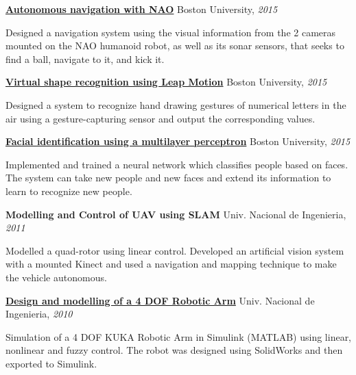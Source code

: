 \documentclass[letterpaper,MMMyyyy,nonstop]{simpleresumecv}
\begin{document}
\begin{body}
\href{http://www.bu.edu/vip/files/pubs/reports/DLTM15-06buece.pdf}
{\textbf{Autonomous navigation with NAO}}
\hfill
Boston University, \textit{2015}

\GapNoBreak
\BulletItem
Designed a navigation system using the visual information from the 2 cameras mounted on the NAO humanoid robot, as well as its sonar sensors, that seeks to find a ball, navigate to it, and kick it.
\GapNoBreak

\BigGap
\href{http://www.bu.edu/vip/files/pubs/reports/DLDP15-03buece.pdf}
{\textbf{Virtual shape recognition using Leap Motion}}
\hfill
Boston University, \textit{2015}

\GapNoBreak
\BulletItem
Designed a system to recognize hand drawing gestures of numerical letters in the air using a gesture-capturing sensor and  output the corresponding values.
\GapNoBreak

\BigGap
\href{https://docs.google.com/presentation/d/1328Qvm9VlAZadwlNoU3n5m1REY36m_hGcakSYlxW2vM/edit?ts=565d2938#slide=id.p}
{\textbf{Facial identification using a multilayer perceptron}}
\hfill
Boston University, \textit{2015}

\GapNoBreak
\BulletItem
Implemented and trained a neural network which classifies people based on faces. The system can take new people and new faces and extend its information to learn to recognize new people.
\GapNoBreak

\BigGap
\textbf{Modelling and Control of UAV using SLAM}
\hfill
Univ. Nacional de Ingenieria, \textit{2011}

\GapNoBreak
\BulletItem
Modelled a quad-rotor using linear control. Developed an artificial vision system with a mounted Kinect and used a navigation and mapping technique to make the vehicle autonomous.
\GapNoBreak

\BigGap
\href{https://github.com/davidlavy88/resume/blob/master/Paper/paper-mt-517.pdf}
{\textbf{Design and modelling of a 4 DOF Robotic Arm}}
\hfill
Univ. Nacional de Ingenieria, \textit{2010}

\GapNoBreak
\BulletItem
Simulation of a 4 DOF KUKA Robotic Arm in Simulink (MATLAB) using linear, nonlinear and fuzzy control. The robot was designed using SolidWorks and then exported to Simulink.
\GapNoBreak


\end{body}
\end{document}
